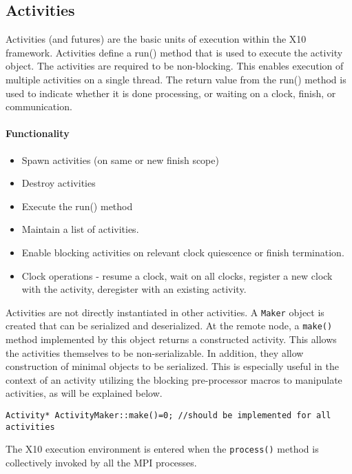 
\subsection{Activities}

Activities (and futures) are the basic units of execution within the
X10 framework. Activities define a run() method that is used to
execute the activity object. The activities are required to be
non-blocking. This enables execution of multiple activities on a
single thread. The return value from the run() method is used to
indicate whether it is done processing, or waiting on a clock, finish,
or communication. 

\paragraph{Functionality}

\begin{itemize}
\item Spawn activities (on same or new finish scope)
\item Destroy activities
\item Execute the run() method
\item Maintain a list of activities.
\item Enable blocking activities on relevant clock quiescence or finish
  termination. 
\item Clock operations - resume a clock, wait on all clocks, register a
  new clock with the activity, deregister with an existing activity. 
\end{itemize}

Activities are not directly instantiated in other activities. A {\tt Maker}
object is created that can be serialized and deserialized. At the
remote node, a {\tt make()} method implemented by this object returns a
constructed activity. This allows the activities themselves to be
non-serializable. In addition, they allow construction of minimal
objects to be serialized. This is especially useful in the context of
an activity utilizing the blocking pre-processor macros to manipulate
activities, as will be explained below.

\begin{verbatim}
Activity* ActivityMaker::make()=0; //should be implemented for all activities 
\end{verbatim}

The X10 execution environment is entered when the {\tt process()} method is
collectively invoked by all the MPI processes. 

